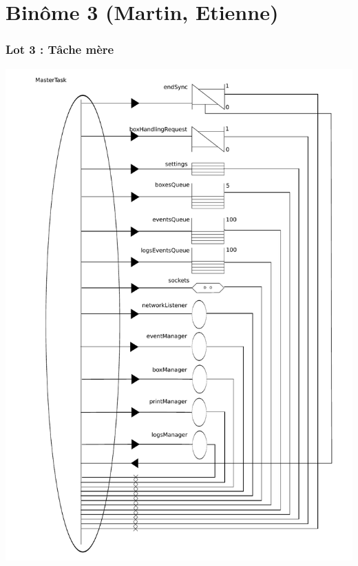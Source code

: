 \documentclass{beamer}
\begin{document}
\section{Binôme 3 (Martin, Etienne)}
	\begin{frame}
	\begin{center}
		\frametitle{Lot 3 : Tâche mère}
		\includegraphics[height=0.8\textheight]{../../SchemasLCG/masterTask.pdf}
	\end{center}
	\end{frame}
	
\end{document}
